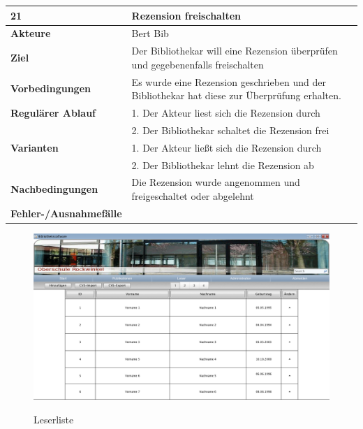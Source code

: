 \documentclass[fontsize=12pt,paper=a4,twoside]{scrartcl}
\begin{document}
\begin{table}[htbp]
\label{21}
\begin{tabular}{|l|p{10cm}|}
\hline 
\textbf{21} & \textbf{Rezension freischalten} \\ \hline
\textbf{Akteure} & Bert Bib\\ \hline
\textbf{Ziel} & Der Bibliothekar will eine Rezension überprüfen und gegebenenfalls freischalten \\ \hline
\textbf{Vorbedingungen} & Es wurde eine Rezension geschrieben und der Bibliothekar hat diese zur 
Überprüfung erhalten. \\ \hline
\textbf{Regulärer Ablauf} & 
1. Der Akteur liest sich die Rezension durch \\
&2. Der Bibliothekar schaltet die Rezension frei\\
\hline
\textbf{Varianten} & 
1. Der Akteur ließt sich die Rezension durch \\
&2. Der Bibliothekar lehnt die Rezension ab \\ \hline
\textbf{Nachbedingungen} & Die Rezension wurde angenommen und freigeschaltet oder abgelehnt\\ 
\hline
\textbf{Fehler-/Ausnahmefälle} & \\
\hline
\end{tabular}
\end{table}

\begin{figure}[htbp]
\caption{Leserliste}
\includegraphics[width=1\textwidth]{ScreensWebsite/Leserliste.png}
  \label{Leserliste}
\end{figure}
\end{document}
